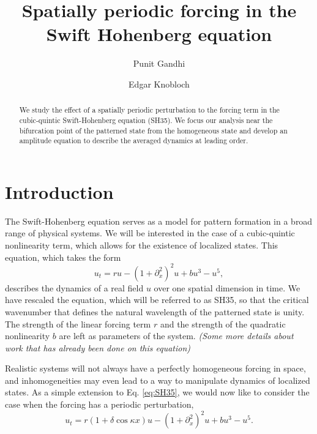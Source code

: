 \documentclass[api,pof,pre,12pt,a4paper]{revtex4-1}
\begin{document}

\title{Spatially periodic forcing in the Swift Hohenberg equation}

\author{Punit Gandhi}
\author{Edgar Knobloch}

\begin{abstract}
We study the effect of a spatially periodic perturbation to the forcing term in the cubic-quintic Swift-Hohenberg equation (SH35).  We focus our analysis near the bifurcation point of the patterned state from the homogeneous state and develop an amplitude equation to describe the averaged dynamics at leading order.  
\end{abstract}

\maketitle

\section{Introduction}
The Swift-Hohenberg equation serves as a model for pattern formation in a broad range of physical systems.  We will be interested in the case of a cubic-quintic nonlinearity term, which allows for the existence of localized states.  This equation, which takes the form  
\begin{equation}
u_t= r u-\left(1+\partial_{x}^2\right)^2u+bu^3-u^5\label{eq:SH35},
\end{equation}
describes the dynamics of a real field $u$ over one spatial dimension in time.  We have rescaled the equation, which will be referred to as SH35, so that the critical wavenumber that defines the natural wavelength of the patterned state is unity. The strength of the linear forcing term $r$ and the strength of the quadratic nonlinearity $b$ are left as parameters of the system.  {\it (Some more details about work that has already been done on this equation)} 


Realistic systems will not always have a perfectly homogeneous forcing in space, and inhomogeneities may even lead to a way to manipulate dynamics of localized states. As a simple extension to Eq. \ref{eq:SH35}, we would now like to consider the case when the forcing has a periodic perturbation,
\begin{equation}
u_t= r(1+\delta \cos{\kappa x}) u -\left(1+\partial_{x}^2\right)^2u+bu^3-u^5\label{eq:SH35spf}.
\end{equation}
\end{document}
